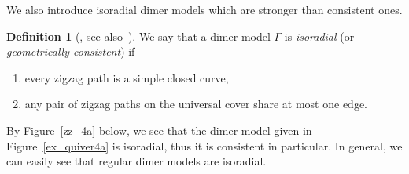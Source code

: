 \documentclass[11pt]{amsart}
\theoremstyle{definition}
\newtheorem{defi}[theo]{Definition}
\begin{document}
We also introduce isoradial dimer models which are stronger than consistent ones.

\begin{defi}[{\cite[Theorem~5.1]{KS}, see also~\cite{Duf,Mer}}]\label{def_isoradial}
We say that a dimer model $\Gamma$ is \emph{isoradial} (or \emph{geometrically consistent}) if
\begin{enumerate}[\rm(1)]
\item every zigzag path is a simple closed curve,
\item any pair of zigzag paths on the universal cover share at most one edge.
\end{enumerate}
\end{defi}

By Figure~\ref{zz_4a} below, we see that the dimer model given in Figure~\ref{ex_quiver4a} is isoradial, thus it is consistent in particular. In general, we can easily see that regular dimer models are isoradial.

\end{document}
